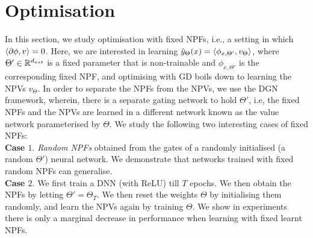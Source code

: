 \section{Optimisation}\label{sec:optimisation}
In this section, we study optimisation with fixed NPFs, i.e., a setting in which $\langle \partial \phi,v\rangle=0$. Here, we are interested in learning $\hat{y}_{\Theta}(x)=\langle \phi_{x,\Theta'}, v_{\Theta}\rangle$, where $\Theta'\in\mathbb{R}^{d_{net}}$ is a fixed parameter that is non-trainable and $\phi_{x,\Theta'}$ is the corresponding fixed NPF, and optimising with GD boils down to learning the NPVs $v_{\Theta}$. In order to separate the NPFs from the NPVs, we use the DGN framework, wherein, there is a separate gating network to hold $\Theta'$, i.e, the fixed NPFs and the NPVs are learned in a different network known as the value network parameterised by $\Theta$. We study the following two interesting cases of fixed NPFs:\\
\textbf{Case $1.$} \emph{Random NPFs} obtained from the gates of a randomly initialised (a random $\Theta'$) neural network. We demonstrate that networks trained with fixed random NPFs can generalise.\\
\textbf{Case $2.$} We first train a DNN (with ReLU) till $T$ epochs. We then obtain the NPFs by letting $\Theta'=\Theta_T$. We then reset the weights $\Theta$ by initialising them randomly, and learn the NPVs again by training $\Theta$. We show in experiments there is only a marginal decrease in performance when learning with fixed learnt NPFs.
\FloatBarrier
